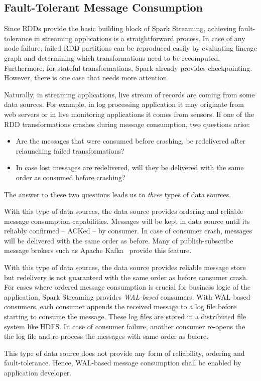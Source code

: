 \clearpage
\subsection{Fault-Tolerant Message Consumption}
Since RDDs provide the basic building block of Spark Streaming, achieving fault-tolerance in streaming applications is a straightforward process. In case of any node failure, failed RDD partitions can be reproduced easily by evaluating lineage graph and determining which transformations need to be recomputed. Furthermore, for stateful transformations, Spark already provides checkpointing. However, there is one case that needs more attention.

Naturally, in streaming applications, live stream of records are coming from some data sources. For example, in log processing application it may originate from web servers or in live monitoring applications it comes from sensors. If one of the RDD transformations crashes during message consumption, two questions arise:
\begin{itemize}
    \item Are the messages that were consumed before crashing, be redelivered after relaunching failed transformations?
    \item In case lost messages are redelivered, will they be delivered with the same order as consumed before crashing?
\end{itemize}
The answer to these two questions leads us to \emph{three} types of data sources.
\begin{description}[leftmargin=0pt]
    \item[Reliable Ordered] With this type of data sources, the data source provides ordering and reliable message consumption capabilities. Messages will be kept in data source until its reliably confirmed -- ACKed -- by consumer. In case of consumer crash, messages will be delivered with the same order as before. Many of publish-subscribe message brokers such as Apache Kafka~\cite{kafka} provide this feature.
    \item[Reliable Unordered] With this type of data sources, the data source provides reliable message store but redelivery is not guaranteed with the same order as before consumer crash. For cases where ordered message consumption is crucial for business logic of the application, Spark Streaming provides \emph{WAL-based} consumers. With WAL-based consumers, each consumer appends the received message to a log file before starting to consume the message. These log files are stored in a distributed file system like HDFS. In case of consumer failure, another consumer re-opens the the log file and re-process the messages with same order as before.
    \item[Unreliable] This type of data source does not provide any form of reliability, ordering and fault-tolerance. Hence, WAL-based message consumption shall be enabled by application developer.
\end{description}

